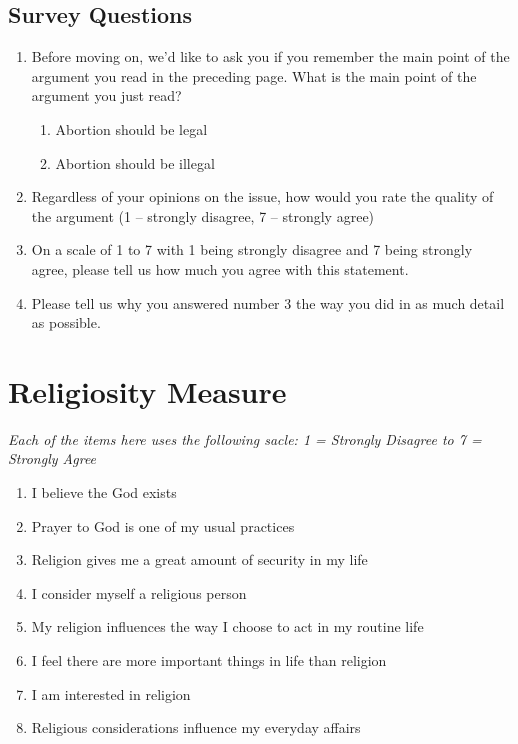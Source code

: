 \documentclass[12pt, titlepage]{article}
\newcommand\e{\emph}
\begin{document}
\subsection*{Survey Questions}
\begin{enumerate}
	\item Before moving on, we’d like to ask you if you remember the main point of the argument you read in the preceding page. What is the main point of the argument you just read?
	\begin{enumerate}
		\item Abortion should be legal
		\item	Abortion should be illegal
	\end{enumerate}
	 
	\item	Regardless of your opinions on the issue, how would you rate the quality of the argument (1 – strongly disagree, 7 – strongly agree) 
	\item	On a scale of 1 to 7 with 1 being strongly disagree and 7 being strongly agree, please tell us how much you agree with this statement.
	\item Please tell us why you answered number 3 the way you did in as much detail as possible.
\end{enumerate}

\section*{Religiosity Measure}

\begin{center}
	\e{Each of the items here uses the following sacle: 1 = Strongly Disagree to 7 = Strongly Agree}
\end{center}

\begin{enumerate}
	\item I believe the God exists
	\item Prayer to God is one of my usual practices
	\item Religion gives me a great amount of security in my life
	\item I consider myself a religious person
	\item My religion influences the way I choose to act in my routine life
	\item I feel there are more important things in life than religion
	\item I am interested in religion 
	\item Religious considerations influence my everyday affairs
\end{enumerate}
\end{document}
